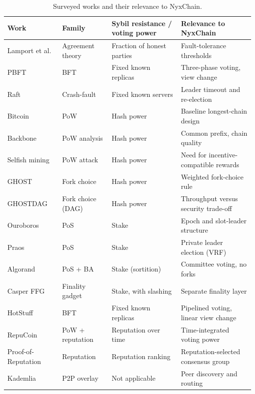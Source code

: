 \documentclass[11pt,a4paper]{article}
\begin{document}
\begin{table}[h!]
\centering
\small
\begin{tabularx}{\textwidth}{@{}p{2.6cm}p{2.2cm}YY@{}}
\toprule
\textbf{Work} & \textbf{Family} & \textbf{Sybil resistance / voting power} & \textbf{Relevance to NyxChain} \\
\midrule
Lamport et al.\ \cite{lamport1982} & Agreement theory & Fraction of honest parties & Fault-tolerance thresholds \\
PBFT \cite{castro1999} & BFT & Fixed known replicas & Three-phase voting, view change \\
Raft \cite{ongaro2014} & Crash-fault & Fixed known servers & Leader timeout and re-election \\
Bitcoin \cite{nakamoto2008} & PoW & Hash power & Baseline longest-chain design \\
Backbone \cite{garay2015} & PoW analysis & Hash power & Common prefix, chain quality \\
Selfish mining \cite{eyal2014} & PoW attack & Hash power & Need for incentive-compatible rewards \\
GHOST \cite{sompolinsky2015} & Fork choice & Hash power & Weighted fork-choice rule \\
GHOSTDAG \cite{sompolinsky2018} & Fork choice (DAG) & Hash power & Throughput versus security trade-off \\
Ouroboros \cite{kiayias2017} & PoS & Stake & Epoch and slot-leader structure \\
Praos \cite{david2018} & PoS & Stake & Private leader election (VRF) \\
Algorand \cite{gilad2017} & PoS + BA & Stake (sortition) & Committee voting, no forks \\
Casper FFG \cite{buterin2017} & Finality gadget & Stake, with slashing & Separate finality layer \\
HotStuff \cite{yin2019} & BFT & Fixed known replicas & Pipelined voting, linear view change \\
RepuCoin \cite{yu2019} & PoW + reputation & Reputation over time & Time-integrated voting power \\
Proof-of-Reputation \cite{aluko2021} & Reputation & Reputation ranking & Reputation-selected consensus group \\
Kademlia \cite{maymounkov2002} & P2P overlay & Not applicable & Peer discovery and routing \\
\bottomrule
\end{tabularx}
\caption{Surveyed works and their relevance to NyxChain.}
\end{table}
\end{document}
